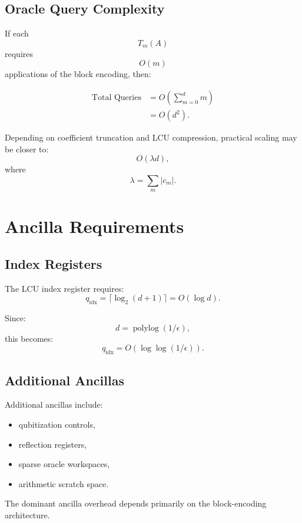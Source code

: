 \documentclass[12pt,a4paper]{article}
\newcommand{\polylog}{\operatorname{polylog}}
\begin{document}
\subsection{Oracle Query Complexity}

If each
\[
T_m(A)
\]
requires
\[
O(m)
\]
applications of the block encoding, then:

\begin{align}
\text{Total Queries}
&=
O\left(
\sum_{m=0}^d m
\right)
\\
&=
O(d^2).
\end{align}

Depending on coefficient truncation and LCU compression, practical scaling may be closer to:
\[
O(\lambda d),
\]
where
\[
\lambda
=
\sum_m |c_m|.
\]


\section{Ancilla Requirements}

\subsection{Index Registers}

The LCU index register requires:
\[
q_{\mathrm{idx}}
=
\lceil
\log_2(d+1)
\rceil
=
O(\log d).
\]

Since:
\[
d = \polylog(1/\epsilon),
\]
this becomes:
\[
q_{\mathrm{idx}}
=
O(\log\log(1/\epsilon)).
\]

\subsection{Additional Ancillas}

Additional ancillas include:

\begin{itemize}
    \item qubitization controls,
    \item reflection registers,
    \item sparse oracle workspaces,
    \item arithmetic scratch space.
\end{itemize}

The dominant ancilla overhead depends primarily on the block-encoding architecture.

\end{document}
